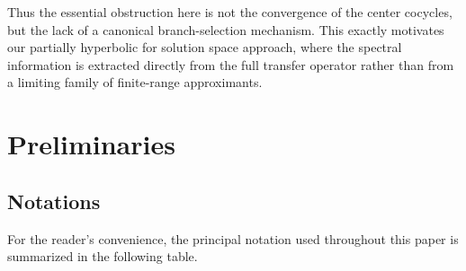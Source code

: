 \documentclass[reqno,11pt]{amsart}
\begin{document}
Thus the essential obstruction here is not the convergence of the center cocycles, but the lack of a canonical branch-selection mechanism. This exactly motivates our partially hyperbolic for solution space approach, where the spectral information is extracted directly from the full transfer operator rather than from a limiting family of finite-range approximants.











\section{Preliminaries}


\subsection{Notations}
For the reader's convenience, the principal notation used throughout this paper is summarized in the following table.
\end{document}
